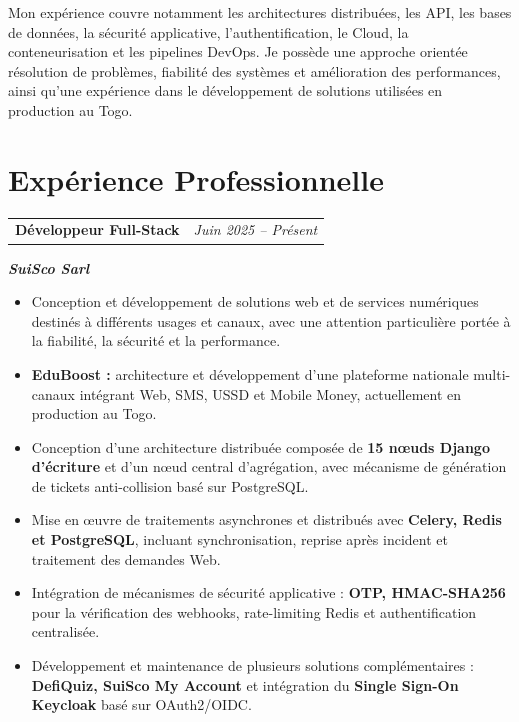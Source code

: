 \documentclass[10pt,a4paper]{article}
\makeatletter
\newcommand{\cventry}[4]{%
    \needspace{4\baselineskip}%
    \noindent
    \begin{tabularx}{\linewidth}{
        @{}
        X
        >{\raggedleft\arraybackslash}p{3.2cm}
        @{}
    }
        \textbf{\large #1}
        &
        {\small\color{secondary}\textit{#2}}
    \end{tabularx}
    \par
    \noindent\textbf{\textit{#3}}
    \par
    \noindent{\small #4}
    \par
    \vspace{2.5pt}
}
\makeatother
\begin{document}
Mon expérience couvre notamment les architectures distribuées, les API,
les bases de données, la sécurité applicative, l'authentification,
le Cloud, la conteneurisation et les pipelines DevOps. Je possède une
approche orientée résolution de problèmes, fiabilité des systèmes et
amélioration des performances, ainsi qu'une expérience dans le développement
de solutions utilisées en production au Togo.


\section{Expérience Professionnelle}

\cventry
{Développeur Full-Stack}
{Juin 2025 -- Présent}
{SuiSco Sarl}
{Lomé, Togo}

\begin{itemize}

    \item Conception et développement de solutions web et de services
    numériques destinés à différents usages et canaux, avec une attention
    particulière portée à la fiabilité, la sécurité et la performance.

    \item \textbf{EduBoost :} architecture et développement d'une plateforme
    nationale multi-canaux intégrant Web, SMS, USSD et Mobile Money,
    actuellement en production au Togo.

    \item Conception d'une architecture distribuée composée de
    \textbf{15 nœuds Django d'écriture} et d'un nœud central d'agrégation,
    avec mécanisme de génération de tickets anti-collision basé sur PostgreSQL.

    \item Mise en œuvre de traitements asynchrones et distribués avec
    \textbf{Celery, Redis et PostgreSQL}, incluant synchronisation,
    reprise après incident et traitement des demandes Web.

    \item Intégration de mécanismes de sécurité applicative :
    \textbf{OTP, HMAC-SHA256} pour la vérification des webhooks,
    rate-limiting Redis et authentification centralisée.

    \item Développement et maintenance de plusieurs solutions complémentaires :
    \textbf{DefiQuiz, SuiSco My Account} et intégration du
    \textbf{Single Sign-On Keycloak} basé sur OAuth2/OIDC.

\end{itemize}
\end{document}
